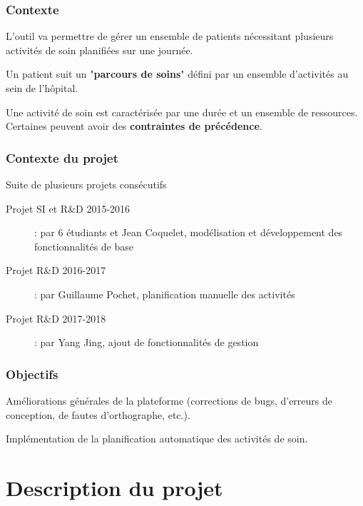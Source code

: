 \documentclass{beamer}
\begin{document}
\begin{frame}
\frametitle{Contexte}
	
	L'outil va permettre de gérer un ensemble de patients nécessitant plusieurs activités de soin planifiées sur une journée.
	
	\bigbreak
	
	Un patient suit un "\textbf{parcours de soins}" défini par un ensemble d'activités au sein de l'hôpital.
	
	\bigbreak
	
	Une activité de soin est caractérisée par une durée et un ensemble de ressources. Certaines peuvent avoir des \textbf{contraintes de précédence}. 
	
\end{frame}


\begin{frame}
\frametitle{Contexte du projet}

\begin{block}{Suite de plusieurs projets consécutifs}
	\begin{description}
		\item[Projet SI et R\&D 2015-2016]: par 6 étudiants et Jean Coquelet, modélisation et développement des fonctionnalités de base
		\item[Projet R\&D 2016-2017]: par Guillaume Pochet, planification manuelle des activités
		\item[Projet R\&D 2017-2018]: par Yang Jing, ajout de fonctionnalités de gestion
	\end{description}
\end{block}

\end{frame}

\begin{frame}
\frametitle{Objectifs}

Améliorations générales de la plateforme (corrections de bugs, d'erreurs de conception, de fautes d'orthographe, etc.).

\bigbreak

Implémentation de la planification automatique des activités de soin.

\end{frame}

\section[Description]{Description du projet}
\end{document}
